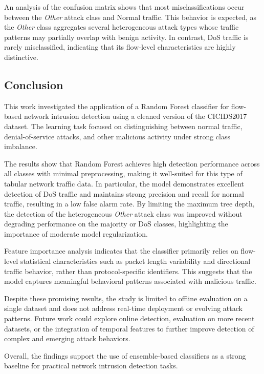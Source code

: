 \documentclass[conference]{IEEEtran}
\begin{document}
An analysis of the confusion matrix shows that most misclassifications occur between the \textit{Other} attack class and Normal traffic. This behavior is expected, as the \textit{Other} class aggregates several heterogeneous attack types whose traffic patterns may partially overlap with benign activity. In contrast, DoS traffic is rarely misclassified, indicating that its flow-level characteristics are highly distinctive.


\subsection{Conclusion}
This work investigated the application of a Random Forest classifier for flow-based network intrusion detection using a cleaned version of the CICIDS2017 dataset. The learning task focused on distinguishing between normal traffic, denial-of-service attacks, and other malicious activity under strong class imbalance.  

The results show that Random Forest achieves high detection performance across all classes with minimal preprocessing, making it well-suited for this type of tabular network traffic data. In particular, the model demonstrates excellent detection of DoS traffic and maintains strong precision and recall for normal traffic, resulting in a low false alarm rate. By limiting the maximum tree depth, the detection of the heterogeneous \textit{Other} attack class was improved without degrading performance on the majority or DoS classes, highlighting the importance of moderate model regularization.  

Feature importance analysis indicates that the classifier primarily relies on flow-level statistical characteristics such as packet length variability and directional traffic behavior, rather than protocol-specific identifiers. This suggests that the model captures meaningful behavioral patterns associated with malicious traffic.  

Despite these promising results, the study is limited to offline evaluation on a single dataset and does not address real-time deployment or evolving attack patterns. Future work could explore online detection, evaluation on more recent datasets, or the integration of temporal features to further improve detection of complex and emerging attack behaviors.

Overall, the findings support the use of ensemble-based classifiers as a strong baseline for practical network intrusion detection tasks.
\end{document}
